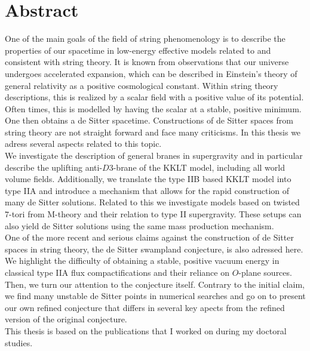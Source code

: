 \documentclass[12pt]{report}
\begin{document}
\section*{Abstract}
One of the main goals of the field of string phenomenology is to describe the properties of our spacetime in low-energy effective models related to and consistent with string theory. It is known from observations that our universe undergoes accelerated expansion, which can be described in Einstein's theory of general relativity as a positive cosmological constant. Within string theory descriptions, this is realized by a scalar field with a positive value of its potential. Often times, this is modelled by having the scalar at a stable, positive minimum. One then obtains a de Sitter spacetime. Constructions of de Sitter spaces from string theory are not straight forward and face many criticisms. In this thesis we adress several aspects related to this topic.\\
We investigate the description of general branes in supergravity and in particular describe the uplifting anti-$D3$-brane of the KKLT model, including all world volume fields. Additionally, we translate the type IIB based KKLT model into type IIA and introduce a mechanism that allows for the rapid construction of many de Sitter solutions. Related to this we investigate models based on twisted $7$-tori from M-theory and their relation to type II supergravity. These setups can also yield de Sitter solutions using the same mass production mechanism.\\
One of the more recent and serious claims against the construction of de Sitter spaces in string theory, the de Sitter swampland conjecture, is also adressed here. We highlight the difficulty of obtaining a stable, positive vacuum energy in classical type IIA flux compactifications and their reliance on $O$-plane sources. Then, we turn our attention to the conjecture itself. Contrary to the initial claim, we find many unstable de Sitter points in numerical searches and go on to present our own refined conjecture that differs in several key apects from the refined version of the original conjecture.\vspace{12pt}\\
This thesis is based on the publications \cite{Roupec:2018mbn,Banlaki:2018ayh,Andriot:2018mav,Cribiori:2019hod,Cribiori:2019bfx,Cribiori:2019drf,Cribiori:2019hrb,Cribiori:2020bgt} that I worked on during my doctoral studies.
\end{document}
